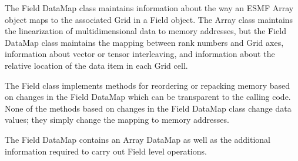 

The Field DataMap class maintains information about the way an ESMF Array
object maps to the associated Grid in a Field object.  The Array class
maintains the linearization of multidimensional data to memory addresses,
but the Field DataMap class maintains the mapping between rank numbers and
Grid axes, information about vector or tensor interleaving, and information
about the relative location of the data item in each Grid cell.

The Field class implements methods for reordering or repacking
memory based on changes in the Field DataMap which can be 
transparent to the calling code.  None of the
methods based on changes in the Field DataMap class change 
data values; they simply change the mapping to memory addresses. 

The Field DataMap contains an Array DataMap as well as the
additional information required to carry out Field level operations.


